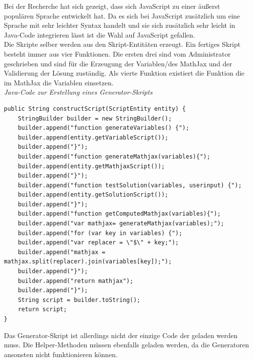Bei der Recherche hat sich gezeigt, dass sich JavaScript zu einer äußerst populären Sprache entwickelt hat. Da es sich bei JavaScript zusätzlich um eine Sprache mit sehr leichter Syntax handelt und sie sich zusätzlich sehr leicht in Java-Code integrieren lässt ist die Wahl auf JavaScript gefallen. \\

Die Skripte selber werden aus den Skript-Entitäten erzeugt. Ein fertiges Skript besteht immer aus vier Funktionen. Die ersten drei sind vom Administrator geschrieben und sind für die Erzeugung der Variablen/des MathJax und der Validierung der Lösung zuständig. Als vierte Funktion existiert die Funktion die im MathJax die Variablen einsetzen.\\

\emph{Java-Code zur Erstellung eines Generator-Skripts}
\begin{lstlisting}
public String constructScript(ScriptEntity entity) {
	StringBuilder builder = new StringBuilder();
	builder.append("function generateVariables() {");
	builder.append(entity.getVariableScript());
	builder.append("}");
	builder.append("function generateMathjax(variables){");
	builder.append(entity.getMathjaxScript());
	builder.append("}");
	builder.append("function testSolution(variables, userinput) {");
	builder.append(entity.getSolutionScript());
	builder.append("}");
	builder.append("function getComputedMathjax(variables){");
	builder.append("var mathjax= generateMathjax(variables);");
	builder.append("for (var key in variables) {");
	builder.append("var replacer = \"$\" + key;");
	builder.append("mathjax = mathjax.split(replacer).join(variables[key]);");
	builder.append("}");
	builder.append("return mathjax");
	builder.append("}");	
	String script = builder.toString();
	return script;
}
\end{lstlisting}

Das Generator-Skript ist allerdings nicht der einzige Code der geladen werden muss. Die Helper-Methoden müssen ebenfalls geladen werden, da die Generatoren ansonsten nicht funktionieren können. \\

